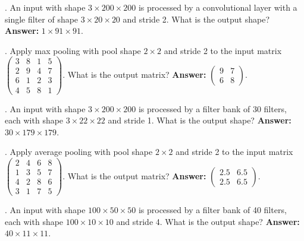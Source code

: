 \bigskip

\noindent
{\bf \theCNNCounter}. An input with shape $3 \times 200 \times 200$ is processed by a convolutional layer with a single filter of shape $3 \times 20 \times 20$ and stride 2. What is the output shape? {\bf Answer:} $1 \times 91 \times 91$.

\bigskip

\noindent
{\bf \theCNNCounter}. Apply max pooling with pool shape $2 \times 2$ and stride 2 to the input matrix $\begin{pmatrix} 3 & 8 & 1 & 5 \\ 2 & 9 & 4 & 7 \\ 6 & 1 & 2 & 3 \\ 4 & 5 & 8 & 1 \end{pmatrix}$. What is the output matrix? {\bf Answer:} $\begin{pmatrix} 9 & 7 \\ 6 & 8 \end{pmatrix}$.

\bigskip

\noindent
{\bf \theCNNCounter}. An input with shape $3 \times 200 \times 200$ is processed by a filter bank of 30 filters, each with shape $3 \times 22 \times 22$ and stride 1. What is the output shape? {\bf Answer:} $30 \times 179 \times 179$.

\bigskip

\noindent
{\bf \theCNNCounter}. Apply average pooling with pool shape $2 \times 2$ and stride 2 to the input matrix $\begin{pmatrix} 2 & 4 & 6 & 8 \\ 1 & 3 & 5 & 7 \\ 4 & 2 & 8 & 6 \\ 3 & 1 & 7 & 5 \end{pmatrix}$. What is the output matrix? {\bf Answer:} $\begin{pmatrix} 2.5 & 6.5 \\ 2.5 & 6.5 \end{pmatrix}$.

\bigskip

\noindent
{\bf \theCNNCounter}. An input with shape $100 \times 50 \times 50$ is processed by a filter bank of 40 filters, each with shape $100 \times 10 \times 10$ and stride 4. What is the output shape? {\bf Answer:} $40 \times 11 \times 11$.

\bigskip

